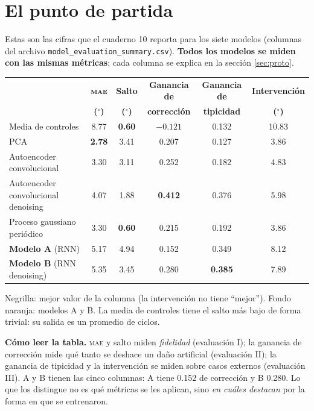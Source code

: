 \documentclass[11pt,a4paper]{article}
\newcommand{\gr}{$^\circ$}
\newcommand{\mae}{\textsc{mae}}
\begin{document}
\section{El punto de partida}

Estas son las cifras que el cuaderno 10 reporta para los siete modelos (columnas del archivo \texttt{model\_evaluation\_summary.csv}). \textbf{Todos los modelos se miden con las mismas métricas}; cada columna se explica en la sección \ref{sec:proto}.

\begin{center}
\footnotesize
\setlength{\tabcolsep}{4pt}
\begin{tabular}{lccccc}
\toprule
 & \textbf{\mae{}} & \textbf{Salto} & \textbf{Ganancia de} & \textbf{Ganancia de} & \textbf{Intervención} \\
 & \textbf{(\gr)} & \textbf{(\gr)} & \textbf{corrección} & \textbf{tipicidad} & \textbf{(\gr)} \\
\midrule
Media de controles & 8.77 & \textbf{0.60} & $-0.121$ & 0.132 & 10.83 \\
PCA & \textbf{2.78} & 3.41 & 0.207 & 0.127 & 3.86 \\
Autoencoder convolucional & 3.30 & 3.11 & 0.252 & 0.182 & 4.83 \\
Autoencoder convolucional denoising & 4.07 & 1.88 & \textbf{0.412} & 0.376 & 5.98 \\
Proceso gaussiano periódico & 3.30 & \textbf{0.60} & 0.215 & 0.192 & 3.86 \\
\rowcolor{naranjac}\textbf{Modelo A} (RNN) & 5.17 & 4.94 & 0.152 & 0.349 & 8.12 \\
\rowcolor{naranjac}\textbf{Modelo B} (RNN denoising) & 5.35 & 3.45 & 0.280 & \textbf{0.385} & 7.89 \\
\bottomrule
\end{tabular}
\end{center}

{\small Negrilla: mejor valor de la columna (la intervención no tiene ``mejor''). Fondo naranja: modelos A y B. La media de controles tiene el salto más bajo de forma trivial: su salida es un promedio de ciclos.}

\textbf{Cómo leer la tabla.} \mae{} y salto miden \emph{fidelidad} (evaluación I); la ganancia de corrección mide qué tanto se deshace un daño artificial (evaluación II); la ganancia de tipicidad y la intervención se miden sobre casos externos (evaluación III). A y B tienen las cinco columnas: A tiene 0.152 de corrección y B 0.280. Lo que los distingue no es qué métricas se les aplican, sino \emph{en cuáles destacan} por la forma en que se entrenaron.
\end{document}
